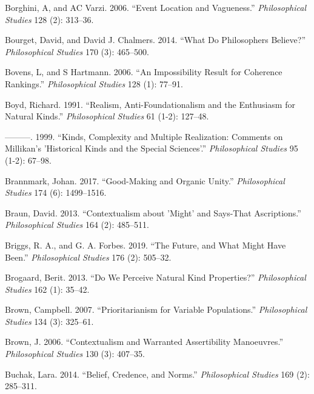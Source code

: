 \documentclass[
  10pt,
  letterpaper,
  DIV=11,
  numbers=noendperiod,
  twoside]{scrartcl}
\newlength{\cslhangindent}
\newenvironment{CSLReferences}[2] %
 {\begin{list}{}{%
  \setlength{\itemindent}{0pt}
  \setlength{\leftmargin}{0pt}
  \setlength{\parsep}{0pt}
  \ifodd #1
   \setlength{\leftmargin}{\cslhangindent}
   \setlength{\itemindent}{-1\cslhangindent}
  \fi
  \setlength{\itemsep}{#2\baselineskip}}}
 {\end{list}}
\begin{document}
\begin{CSLReferences}{1}{0}
Borghini, A, and AC Varzi. 2006. {``Event Location and Vagueness.''}
\emph{Philosophical Studies} 128 (2): 313--36.

Bourget, David, and David J. Chalmers. 2014. {``What Do Philosophers
Believe?''} \emph{Philosophical Studies} 170 (3): 465--500.

Bovens, L, and S Hartmann. 2006. {``An Impossibility Result for
Coherence Rankings.''} \emph{Philosophical Studies} 128 (1): 77--91.

Boyd, Richard. 1991. {``Realism, Anti-Foundationalism and the Enthusiasm
for Natural Kinds.''} \emph{Philosophical Studies} 61 (1-2): 127--48.

---------. 1999. {``Kinds, Complexity and Multiple Realization: Comments
on Millikan's 'Historical Kinds and the Special Sciences'.''}
\emph{Philosophical Studies} 95 (1-2): 67--98.

Brannmark, Johan. 2017. {``Good-Making and Organic Unity.''}
\emph{Philosophical Studies} 174 (6): 1499--1516.

Braun, David. 2013. {``Contextualism about 'Might' and Says-That
Ascriptions.''} \emph{Philosophical Studies} 164 (2): 485--511.

Briggs, R. A., and G. A. Forbes. 2019. {``The Future, and What Might
Have Been.''} \emph{Philosophical Studies} 176 (2): 505--32.

Brogaard, Berit. 2013. {``Do We Perceive Natural Kind Properties?''}
\emph{Philosophical Studies} 162 (1): 35--42.

Brown, Campbell. 2007. {``Prioritarianism for Variable Populations.''}
\emph{Philosophical Studies} 134 (3): 325--61.

Brown, J. 2006. {``Contextualism and Warranted Assertibility
Manoeuvres.''} \emph{Philosophical Studies} 130 (3): 407--35.

Buchak, Lara. 2014. {``Belief, Credence, and Norms.''}
\emph{Philosophical Studies} 169 (2): 285--311.


\end{CSLReferences}
\end{document}

